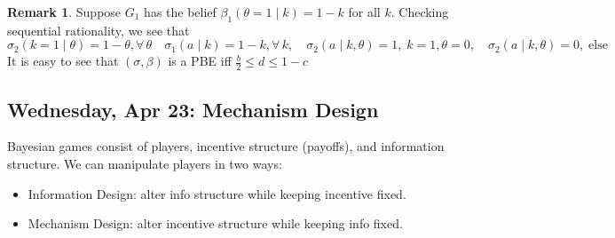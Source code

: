 \documentclass[10pt, oneside]{article}
\theoremstyle{definition}
\newtheorem{rem}{Remark}
\begin{document}
\begin{rem}
    Suppose $G_1$ has the belief $\beta_1(\theta =  1 \mid k) = 1-k$ for all $k.$ Checking sequential rationality, we see that 
    \[\sigma_2(k = 1 \mid \theta) = 1-\theta, \forall\,\theta\quad \sigma_1(a \mid k) = 1-k, \forall\, k, \quad \sigma_2(a \mid k,\theta) = 1, \; k=1, \theta = 0, \quad \sigma_2(a \mid k,\theta) = 0, \; \text{else}\] It is easy to see that $(\sigma, \beta)$ is a PBE iff $\frac{b}{2} \leq d \leq 1-c$
\end{rem}





\newpage
\subsection{Wednesday, Apr 23: Mechanism Design}

Bayesian games consist of players, incentive structure (payoffs), and information structure. We can manipulate players in two ways:
\begin{itemize}
    \item Information Design: alter info structure while keeping incentive fixed. 
    \item Mechanism Design: alter incentive structure while keeping info fixed. 
\end{itemize}
\end{document}
